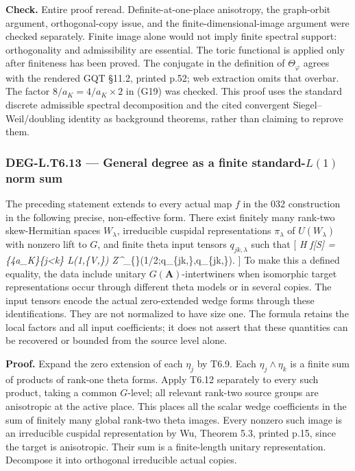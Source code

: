 \documentclass[11pt,a4paper]{article}
\theoremstyle{definition}
\begin{document}
\textbf{Check.} Entire proof reread. Definite-at-one-place anisotropy,
the graph-orbit argument, orthogonal-copy issue, and the
finite-dimensional-image argument were checked separately. Finite image
alone would not imply finite spectral support: orthogonality and
admissibility are essential. The toric functional is applied only after
finiteness has been proved. The conjugate in the definition of
\(\Theta_\varphi\) agrees with the rendered GQT §11.2, printed p.52; web
extraction omits that overbar. The factor \(8/a_K=4/a_K\times2\) in
(G19) was checked. This proof uses the standard discrete admissible
spectral decomposition and the cited convergent Siegel--Weil/doubling
identity as background theorems, rather than claiming to reprove them.

\subsubsection{\texorpdfstring{DEG-L.T6.13 --- General degree as a
finite standard-\(L(1)\) norm
sum}{DEG-L.T6.13 --- General degree as a finite standard-L(1) norm sum}}\label{deg-l.t6.13-general-degree-as-a-finite-standard-l1-norm-sum}

The preceding statement extends to every actual map \(f\) in the 032
construction in the following precise, non-effective form. There exist
finitely many rank-two skew-Hermitian spaces \(W_\lambda\), irreducible
cuspidal representations \(\pi_\lambda\) of \(U(W_\lambda)\) with
nonzero lift to \(G\), and finite theta input tensors \(q_{jk,\lambda}\)
such that {[} \deg\emph{H f{[}S{]}
=\{4\over a\_K\}\sum\emph{\{j\textless k\}\sum}\lambda
L(1,\pi\emph{\lambda\times\chi}\{V,\lambda\})
\mathcal Z\^{}}\_\{\lambda\}(1/2;q\_\{jk,\lambda\},q\_\{jk,\lambda\}).
 {]} To make this a defined equality, the data include unitary
\(G(\mathbf A)\)-intertwiners when isomorphic target representations
occur through different theta models or in several copies. The input
tensors encode the actual zero-extended wedge forms through these
identifications. They are not normalized to have size one. The formula
retains the local factors and all input coefficients; it does not assert
that these quantities can be recovered or bounded from the source level
alone.

\textbf{Proof.} Expand the zero extension of each \(\eta_j\) by T6.9.
Each \(\eta_j\wedge\eta_k\) is a finite sum of products of rank-one
theta forms. Apply T6.12 separately to every such product, taking a
common \(G\)-level; all relevant rank-two source groups are anisotropic
at the active place. This places all the scalar wedge coefficients in
the sum of finitely many global rank-two theta images. Every nonzero
such image is an irreducible cuspidal representation by Wu, Theorem 5.3,
printed p.15, since the target is anisotropic. Their sum is a
finite-length unitary representation. Decompose it into orthogonal
irreducible actual copies.
\end{document}
